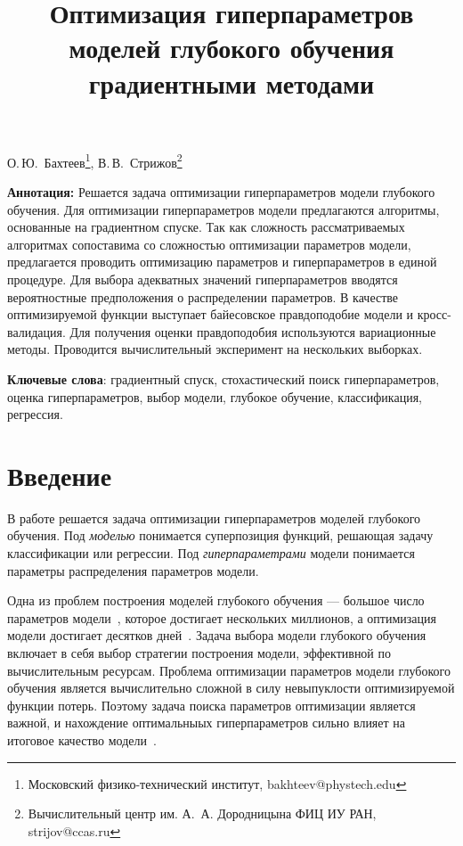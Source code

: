 \documentclass[12pt]{article}
\begin{document}
\title{Оптимизация гиперпараметров моделей глубокого обучения градиентными методами}
\date{}
\maketitle

 \begin{center}
 {О.\,Ю.~Бахтеев\footnote{Московский физико-технический институт, bakhteev@phystech.edu},
 В.\,В.~Стрижов\footnote{Вычислительный центр им. А.~А. Дородницына
 ФИЦ ИУ РАН, strijov@ccas.ru}} %
 \end{center}

\textbf{Аннотация:} 
Решается задача оптимизации гиперпараметров модели глубокого обучения. Для оптимизации гиперпараметров модели предлагаются алгоритмы, основанные на градиентном спуске. Так как сложность рассматриваемых алгоритмах сопоставима со сложностью оптимизации параметров модели, предлагается проводить оптимизацию параметров и гиперпараметров в единой процедуре. Для выбора адекватных значений гиперпараметров вводятся вероятностные предположения о распределении параметров. В качестве оптимизируемой функции выступает байесовское правдоподобие модели и кросс-валидация. Для получения оценки правдоподобия используются вариационные методы. Проводится вычислительный эксперимент на нескольких выборках.
\bigskip

\textbf{Ключевые слова}: градиентный спуск, стохастический поиск гиперпараметров, оценка гиперпараметров, выбор модели, глубокое обучение, классификация, регрессия.
\section{Введение}
В работе решается задача оптимизации гиперпараметров моделей глубокого обучения. Под \textit{моделью} понимается суперпозиция функций, решающая задачу классификации или регрессии. Под \textit{гиперпараметрами} модели понимается параметры распределения параметров модели. 

Одна из проблем построения моделей глубокого обучения --- большое число параметров модели~\cite{hinton_rbm}, которое достигает нескольких миллионов, а оптимизация модели достигает десятков дней~\cite{suts}. Задача выбора модели глубокого обучения включает в себя выбор стратегии построения модели, эффективной по вычислительным ресурсам. Проблема оптимизации параметров модели глубокого обучения является вычислительно сложной в силу невыпуклости оптимизируемой функции потерь. Поэтому задача поиска параметров оптимизации является важной, и нахождение оптимальныых гиперпараметров сильно влияет на итоговое качество модели~\cite{journal1,jorunal2}. 
\end{document}
